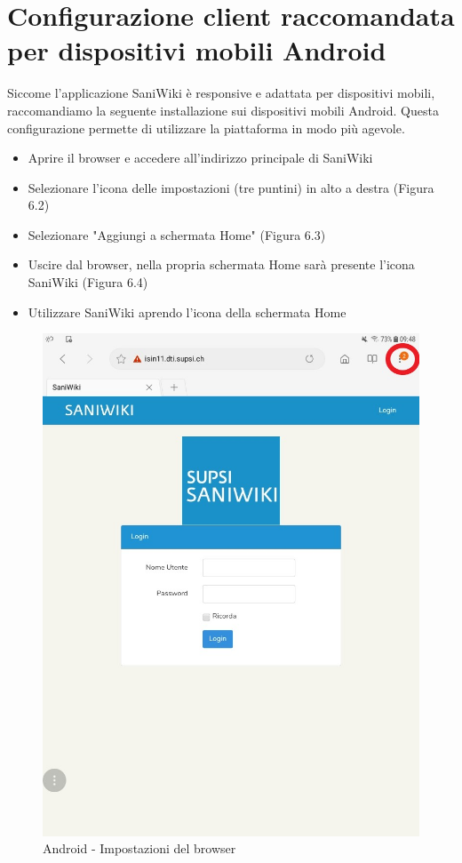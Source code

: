 \documentclass[twoside]{supsistudent}
\begin{document}
\section{Configurazione client raccomandata per dispositivi mobili Android}
Siccome l'applicazione SaniWiki è responsive e adattata per dispositivi mobili, raccomandiamo la seguente installazione sui dispositivi mobili Android. Questa configurazione permette di utilizzare la piattaforma in modo più agevole.
\begin{itemize}
\item Aprire il browser e accedere all'indirizzo principale di SaniWiki
\item Selezionare l'icona delle impostazioni (tre puntini) in alto a destra (Figura 6.2)
\item Selezionare "Aggiungi a schermata Home" (Figura 6.3)
\item Uscire dal browser, nella propria schermata Home sarà presente l'icona SaniWiki (Figura 6.4)
\item Utilizzare SaniWiki aprendo l'icona della schermata Home
\end{itemize}
\begin{figure}[!h]
\centering
\includegraphics[scale=0.3]{saniwiki_android1.png}
\caption{Android - Impostazioni del browser}
\end{figure}
\end{document}
